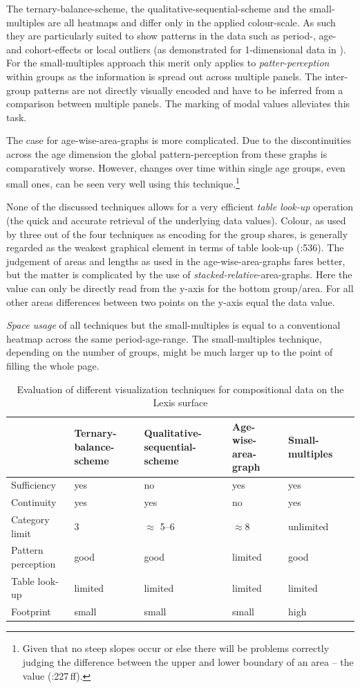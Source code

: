\documentclass[a4paper]{scrartcl}
\newcommand{\tabformat}{\small\centering}
\begin{document}
The ternary-balance-scheme, the qualitative-sequential-scheme and the small-multiples are all heatmaps and differ only in the applied colour-scale. As such they are particularly suited to show patterns in the data such as period-, age- and cohort-effects or local outliers (as demonstrated for 1-dimensional data in \cite{Vaupel1987}). For the small-multiples approach this merit only applies to \emph{patter-perception} within groups as the information is spread out across multiple panels. The inter-group patterns are not directly visually encoded and have to be inferred from a comparison between multiple panels. The marking of modal values alleviates this task.

The case for age-wise-area-graphs is more complicated. Due to the discontinuities across the age dimension the global pattern-perception from these graphs is comparatively worse. However, changes over time within single age groups, even small ones, can be seen very well using this technique.\footnote{Given that no steep slopes occur or else there will be problems correctly judging the difference between the upper and lower boundary of an area -- the value (\cite{Cleveland1994}:227\,ff).}

None of the discussed techniques allows for a very efficient \emph{table look-up} operation (the quick and accurate retrieval of the underlying data values). Colour, as used by three out of the four techniques as encoding for the group shares, is generally regarded as the weakest graphical element in terms of table look-up (\cite{Cleveland1984}:536). The judgement of areas and lengths as used in the age-wise-area-graphs fares better, but the matter is complicated by the use of \emph{stacked-relative}-area-graphs. Here the value can only be directly read from the y-axis for the bottom group/area. For all other areas differences between two points on the y-axis equal the data value.

\emph{Space usage} of all techniques but the small-multiples is equal to a conventional heatmap across the same period-age-range. The small-multiples technique, depending on the number of groups, might be much larger up to the point of filling the whole page.

\begin{table}[!htb]
\tabformat
\begin{tabular}{p{3.5cm}*5{Q{1.5cm}}}
\toprule
 & Ternary-balance-scheme & Qualitative-sequential-scheme & Age-wise-area-graph & Small-multiples \\
\midrule
Sufficiency & yes & no & yes & yes \\
Continuity & yes & yes & no & yes \\
Category limit & 3 & $\approx$ 5--6 & $\approx 8$ & unlimited \\
Pattern perception & good & good & limited & good \\
Table look-up & limited & limited & limited & limited \\
Footprint & small & small & small & high \\
\bottomrule
\end{tabular}
\caption{Evaluation of different visualization techniques for compositional data on the Lexis surface}
\label{tab:eval}
\end{table}
\end{document}
